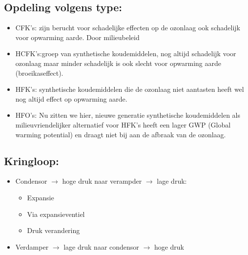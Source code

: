 \documentclass[12pt]{article}
\begin{document}
\subsection{Opdeling volgens type:}
\begin{itemize}
    \item CFK's: zijn berucht voor schadelijke effecten op de ozonlaag ook schadelijk voor opwarming aarde. Door milieubeleid
    \item HCFK's:groep van synthetische koudemiddelen, nog altijd schadelijk voor ozonlaag maar minder schadelijk is ook slecht voor opwarming aarde (broeikaseffect).
    \item HFK's: synthetische koudemiddelen die de ozonlaag niet aantasten heeft wel nog altijd effect op opwarming aarde.
    \item HFO's: Nu zitten we hier, nieuwe generatie synthetische koudemiddelen als milieuvriendelijker alternatief voor HFK's heeft een lager GWP (Global warming potential) en draagt niet bij aan de afbraak van de ozonlaag.
\end{itemize}
\subsection{Kringloop:}
\begin{itemize}
    \item Condensor $\rightarrow$ hoge druk naar verampder $\rightarrow$ lage druk:\begin{itemize}
        \item Expansie 
        \item Via expansieventiel 
        \item Druk verandering
    \end{itemize}
    \item Verdamper $\rightarrow$ lage druk naar condensor $\rightarrow$ hoge druk
\end{itemize}
\end{document}
